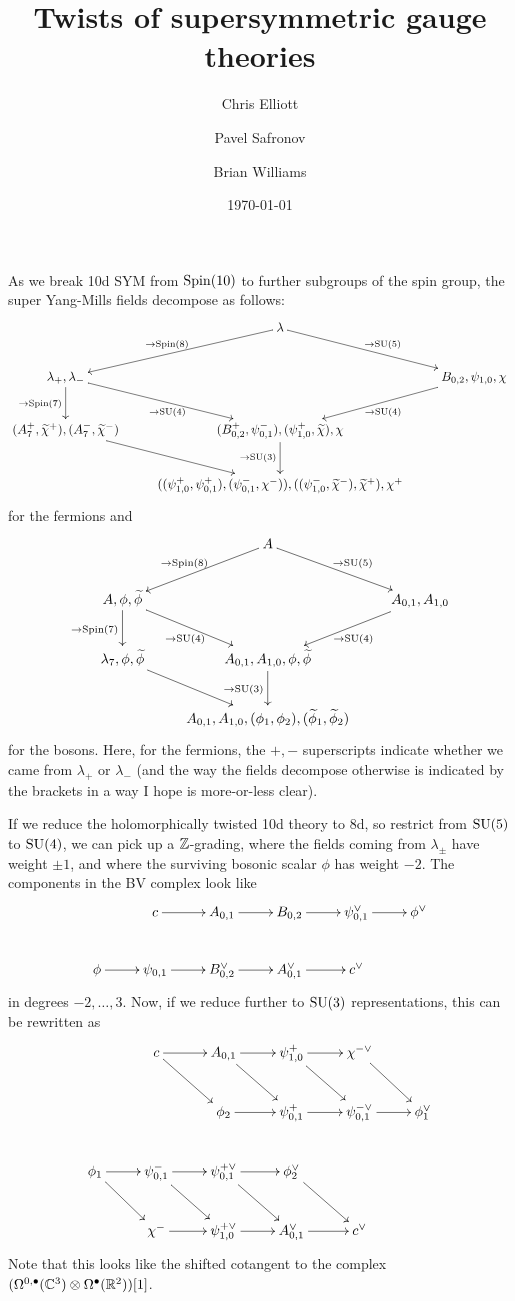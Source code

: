 \documentclass[10pt, oneside]{article}
\title{Twists of supersymmetric gauge theories}
\author{Chris Elliott\and Pavel Safronov \and Brian Williams}
\date{\today}
\begin{document}
As we break 10d SYM from $\mathrm{Spin}(10)$ to further subgroups of the spin group, the super Yang-Mills fields decompose as follows:
\[
\xymatrix{
&\lambda \ar[dl]_{\to \Spin(8)} \ar[dr]^{\to \SU(5)} &\\
\lambda_+, \lambda_- \ar[dr]_{\to \SU(4)} \ar[d]_{\to \Spin(7)} &&B_{0,2}, \psi_{1,0}, \chi \ar[dl]^{\to \SU(4)} \\
(A_7^+, \wt \chi^+), (A_7^-, \wt \chi^-) \ar[dr] &(B_{0,2}^+, \psi_{0,1}^-), (\psi_{1,0}^+, \wt \chi), \chi \ar[d]_{\to \SU(3)} &\\
 &((\psi_{1,0}^+, \psi_{0,1}^+), (\psi_{0,1}^-, \chi^-)), ((\psi_{1,0}^-, \wt \chi^-), \wt \chi^+), \chi^+ &
}\]
for the fermions and
\[\xymatrix{
&A \ar[dl]_{\to \Spin(8)} \ar[dr]^{\to \SU(5)} & \\
A,\phi, \wt \phi \ar[dr]_{\to \SU(4)} \ar[d]_{\to \Spin(7)} &&A_{0,1}, A_{1,0} \ar[dl]^{\to \SU(4)} \\
\lambda_7, \phi, \wt \phi \ar[dr] &A_{0,1},A_{1,0},\phi, \wt \phi \ar[d]_{\to \SU(3)} & \\
&A_{0,1},A_{1,0},(\phi_1,  \phi_2),(\wt \phi_1, \wt \phi_2)&
}
\]
for the bosons.  Here, for the fermions, the $+,-$ superscripts indicate whether we came from $\lambda_+$ or $\lambda_-$ (and the way the fields decompose otherwise is indicated by the brackets in a way I hope is more-or-less clear).  

If we reduce the holomorphically twisted 10d theory to 8d, so restrict from $\mathrm{SU}(5)$ to $\mathrm{SU}(4)$, we can pick up a $\mathbb Z$-grading, where the fields coming from $\lambda_{\pm}$ have weight $\pm 1$, and where the surviving bosonic scalar $\phi$ has weight $-2$.  The components in the BV complex look like
\[\xymatrix{
&c \ar[r] &A_{0,1} \ar[r] &B_{0,2} \ar[r] &\psi_{0,1}^\vee \ar[r] &\phi^\vee \\
\phi \ar[r] &\psi_{0,1} \ar[r] &B_{0,2}^\vee \ar[r] &A_{0,1}^\vee \ar[r] &c^\vee &
}\]
in degrees $-2, \ldots, 3$.  Now, if we reduce further to $\mathrm{SU}(3)$ representations, this can be rewritten as 
\[\xymatrix{
&c \ar[r] \ar[dr] &A_{0,1} \ar[r] \ar[dr] &\psi^+_{1,0} \ar[r] \ar[dr] &\chi^{-\vee} \ar[dr] & \\
&&\phi_2 \ar[r]  &\psi^+_{0,1} \ar[r]  &\psi^{-\vee}_{0,1} \ar[r] &\phi_1^\vee \\
\phi_1 \ar[r] \ar[dr] &\psi_{0,1}^- \ar[r] \ar[dr] &\psi^{+\vee}_{0,1} \ar[r] \ar[dr] &\phi_2^\vee \ar[dr] && \\
&\chi^- \ar[r]  &\psi^{+\vee}_{1,0} \ar[r]  &A_{0,1}^\vee \ar[r] &c^\vee&
}\]
Note that this looks like the shifted cotangent to the complex $(\Omega^{0,\bullet}(\mathbb C^3) \otimes \Omega^\bullet(\mathbb R^2))[1]$.
\end{document}
